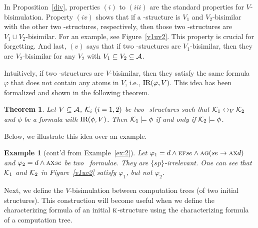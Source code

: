 \documentclass{article}
\newtheorem{example}{Example}
\newtheorem{theorem}{Theorem}
\begin{document}
In Proposition~\ref{div}, properties $(i)$ to $(iii)$ are the standard properties for $V$-bisimulation.
Property $(iv)$ shows that if a \MPK-structure is $V_1$ and $V_2$-bisimilar with the other two \MPK-structures, respectively, then those two \MPK-structures are $V_1 \cup V_2$-bisimilar. For an example, see Figure~\ref{v1uv2}. This property is crucial for forgetting.
And last, $(v)$ says that if two \MPK-structures are  $V_1$-bisimilar, then they are $V_2$-bisimilar for any $V_2$ with $V_1\subseteq V_2 \subseteq {\cal A}$.





Intuitively, if two \MPK-structures are $V$-bisimilar, then they satisfy the same formula $\varphi$ that does not contain any atoms in $V$, i.e., $\textrm{IR}(\varphi, V)$. This idea has been formalized and shown in the following theorem.

\begin{theorem}\label{thm:V-bisimulation:EQ}
  Let $V\subseteq\cal A$, ${\cal K}_i~(i=1,2)$ be two \MPK-structures such that
  ${\cal K}_1\leftrightarrow_V{\cal K}_2$ and $\phi$ be a formula with $\textrm{IR}(\phi,V)$. Then
  ${\cal K}_1\models\phi$ if and only if ${\cal K}_2\models\phi$.
\end{theorem}


Below, we illustrate this idea over an example.

\begin{example}[cont'd from Example~\ref{ex:2}]\label{ex:3}
Let $\varphi_1= d \wedge \textsc{e}\textsc{f} se \wedge \textsc{a}\textsc{g}(se \rightarrow \textsc{a}\textsc{x} d)$ and $\varphi_2= d \wedge \textsc{a} \textsc{x} se$ be two \CTL\ formulae.  They are  $\{sp\}$-irrelevant. One can see that ${\cal K}_1$ and ${\cal K}_2$ in Figure~\ref{v1uv2} satisfy $\varphi_1$, but not $\varphi_2$.

\end{example}
Next, we define the $V$-bisimulation between computation trees (of two initial structures). This construction will become useful when we define the characterizing formula of an initial $\textsc{k}$-structure using the characterizing formula of a computation tree.
\end{document}
